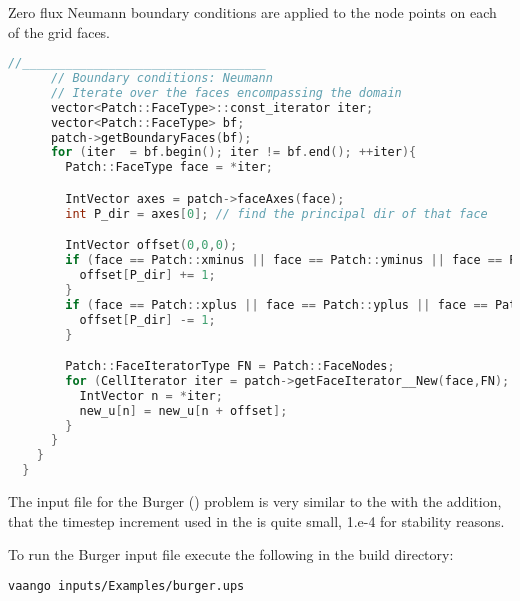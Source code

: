     Zero flux Neumann boundary conditions are applied to the node points
    on each of the grid faces.
\begin{lstlisting}[language=Cpp]
      //__________________________________
      // Boundary conditions: Neumann
      // Iterate over the faces encompassing the domain
      vector<Patch::FaceType>::const_iterator iter;
      vector<Patch::FaceType> bf;
      patch->getBoundaryFaces(bf);
      for (iter  = bf.begin(); iter != bf.end(); ++iter){
        Patch::FaceType face = *iter;

        IntVector axes = patch->faceAxes(face);
        int P_dir = axes[0]; // find the principal dir of that face

        IntVector offset(0,0,0);
        if (face == Patch::xminus || face == Patch::yminus || face == Patch::zminus){
          offset[P_dir] += 1; 
        }
        if (face == Patch::xplus || face == Patch::yplus || face == Patch::zplus){
          offset[P_dir] -= 1;
        }

        Patch::FaceIteratorType FN = Patch::FaceNodes;
        for (CellIterator iter = patch->getFaceIterator__New(face,FN);!iter.done(); iter++){
          IntVector n = *iter;
          new_u[n] = new_u[n + offset];
        }
      }
    }
  }
\end{lstlisting}

The input file for the Burger () problem is very
similar to the  with the addition, that the
timestep increment used in the  is quite small,
1.e-4 for stability reasons.

To run the Burger input file execute the following in the  build
 directory:
\begin{lstlisting}[language=sh,backgroundcolor=\color{background}]
  vaango inputs/Examples/burger.ups
\end{lstlisting}

